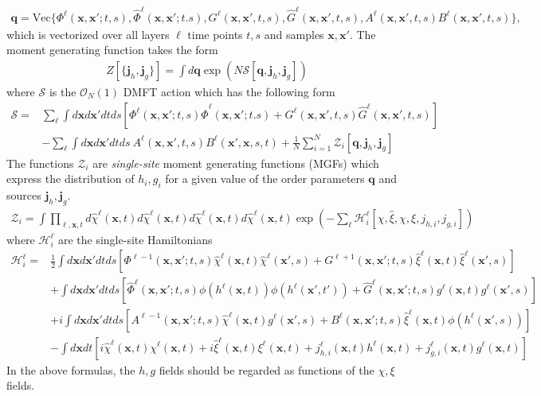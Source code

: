 \documentclass{article} %
\def\x{\bm x}
\begin{document}
\begin{align}
    \bm q = \text{Vec}\{ \Phi^\ell(\x,\x';t,s) , \hat\Phi^\ell(\x,\x';t.s) , G^\ell(\x,\x',t,s), 
    \hat G^\ell(\x,\x',t,s),  A^{\ell}(\x,\x',t,s) B^{\ell}(\x,\x',t,s)  \},
\end{align}
which is vectorized over all layers $\ell$ time points $t,s$ and samples $\x,\x'$. The moment generating function takes the form
\begin{align}
    Z[\{\bm j_h, \bm j_g\}] = \int d\bm q \exp\left( N \mathcal S[\bm q, \bm j_h, \bm j_g] \right)
\end{align}
where $\mathcal S$ is the $\mathcal{O}_N(1)$ DMFT action which has the following form
\begin{align}
    \mathcal S = &\sum_{\ell} \int d\x d\x' dt ds \left[ \Phi^\ell(\x,\x';t,s) \hat\Phi^\ell(\x,\x';t.s) + G^\ell(\x,\x',t,s)
    \hat G^\ell(\x,\x',t,s) \right] \nonumber
    \\
    &-\sum_{\ell} \int d\x d\x' dt ds \  A^{\ell}(\x,\x',t,s) B^{\ell}(\x',\x,s,t) + \frac{1}{N} \sum_{i=1}^N \mathcal{Z}_i[\bm q, \bm j_h, \bm j_g]
\end{align}
The functions $\mathcal Z_i$ are \textit{single-site} moment generating functions (MGFs) which express the distribution of $h_i, g_i$ for a given value of the order parameters $\bm q$ and sources $\bm j_h, \bm j_g$. 
\begin{align}
    \mathcal Z_i = \int \prod_{\ell, \x,t} d\hat{\chi}^\ell(\x,t) d\hat{\chi}^\ell(\x,t) d\hat{\chi}^\ell(\x,t) d\hat{\chi}^\ell(\x,t) \exp\left( - \sum_\ell \mathcal{H}_i^\ell[\hat\chi, \hat\xi,\chi,\xi, j_{h,i} , j_{g,i}] \right)   
\end{align}
where $\mathcal H_i^\ell$ are the single-site Hamiltonians
\begin{align}
    \mathcal H_i^\ell =& \frac{1}{2} \int d\x d\x' dt ds \left[ \Phi^{\ell-1}(\x,\x';t,s) \hat\chi^{\ell}(\x,t) \hat\chi^{\ell}(\x',s)  +  G^{\ell+1}(\x,\x';t,s) \hat\xi^{\ell}(\x,t) \hat\xi^{\ell}(\x',s)    \right] \nonumber
    \\
    &+ \int d\x d\x' dt ds \left[ \hat \Phi^{\ell}(\x,\x';t,s) \phi(h^\ell(\x,t)) \phi(h^\ell(\x',t')) + \hat G^{\ell}(\x,\x';t,s) g^\ell(\x,t) g^\ell(\x',s)  \right] \nonumber
    \\
    &+ i \int d\x d\x' dt ds \left[ A^{\ell-1}(\x,\x';t,s) \hat\chi^\ell(\x,t) g^{\ell}(\x',s) + B^{\ell}(\x,\x';t,s) \hat\xi^\ell(\x,t) \phi(h^\ell(\x',s))   \right] \nonumber
    \\
    &- \int d\x dt  \left[ i \hat\chi^\ell(\x,t) \chi^\ell(\x,t) + i \hat\xi^\ell(\x,t) \xi^\ell(\x,t) + j_{h,i}^\ell(\x,t) h^\ell(\x,t) + j_{g,i}^\ell(\x,t) g^\ell(\x,t) \right] 
\end{align}
In the above formulas, the $h, g$ fields should be regarded as functions of the $\chi, \xi$ fields. 
\end{document}
